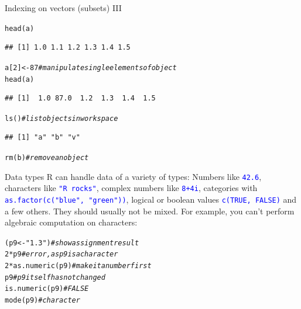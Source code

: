 \documentclass[xcolor=table,           xcolor=dvipsnames]{beamer}\usepackage[]{graphicx}\usepackage[]{color}
\makeatletter
\newcommand{\hlnum}[1]{\textcolor[rgb]{0,0,0}{#1}}
\newcommand{\hlstr}[1]{\textcolor[rgb]{0.545,0.137,0.137}{#1}}
\newcommand{\hlcom}[1]{\textcolor[rgb]{0,0.392,0}{\textit{#1}}}
\newcommand{\hlopt}[1]{\textcolor[rgb]{0,0,0}{#1}}
\newcommand{\hlstd}[1]{\textcolor[rgb]{0,0,0}{#1}}
\newcommand{\hlkwb}[1]{\textcolor[rgb]{0,0,0}{#1}}
\newcommand{\hlkwd}[1]{\textcolor[rgb]{0,0,1}{#1}}
\newenvironment{kframe}{%
 \def\at@end@of@kframe{}%
 \ifinner\ifhmode%
  \def\at@end@of@kframe{\end{minipage}}%
  \begin{minipage}{\columnwidth}%
 \fi\fi%
 \def\FrameCommand##1{\hskip\@totalleftmargin \hskip-\fboxsep
 \colorbox{shadecolor}{##1}\hskip-\fboxsep
     \hskip-\linewidth \hskip-\@totalleftmargin \hskip\columnwidth}%
 \MakeFramed {\advance\hsize-\width
   \@totalleftmargin\z@ \linewidth\hsize
   \@setminipage}}%
 {\par\unskip\endMakeFramed%
 \at@end@of@kframe}
\newenvironment{knitrout}{}{} %
\newcommand{\rcode}[1]{\texttt{\textcolor{Blue}{#1}}} %
\makeatother
\begin{document}
\begin{frame}[fragile]{Indexing on vectors (subsets) III}
\begin{knitrout}
\color{fgcolor}\begin{kframe}
\begin{alltt}
\hlkwd{head}\hlstd{(a)}
\end{alltt}
\begin{verbatim}
## [1] 1.0 1.1 1.2 1.3 1.4 1.5
\end{verbatim}
\begin{alltt}
\hlstd{a[}\hlnum{2}\hlstd{]} \hlkwb{<-} \hlnum{87} \hlcom{# manipulate single elements of object}
\hlkwd{head}\hlstd{(a)}
\end{alltt}
\begin{verbatim}
## [1]  1.0 87.0  1.2  1.3  1.4  1.5
\end{verbatim}
\end{kframe}
\end{knitrout}
\onslide<+->
\begin{knitrout}
\color{fgcolor}\begin{kframe}
\begin{alltt}
\hlkwd{ls}\hlstd{()} \hlcom{# list objects in workspace}
\end{alltt}
\begin{verbatim}
## [1] "a" "b" "v"
\end{verbatim}
\begin{alltt}
\hlkwd{rm}\hlstd{(b)} \hlcom{# remove an object}
\end{alltt}
\end{kframe}
\end{knitrout}
\end{frame}


\begin{frame}[fragile]{Data types}
R can handle data of a variety of types: Numbers like \rcode{42.6}, characters like \rcode{"R rocks"}, complex numbers like \rcode{8+4i}, categories with \rcode{as.factor(c("blue", "green"))}, logical or boolean values \rcode{c(TRUE, FALSE)} and a few others. They should usually not be mixed. For example, you can't perform algebraic computation on characters:
\begin{knitrout}
\color{fgcolor}\begin{kframe}
\begin{alltt}
\hlstd{(p9} \hlkwb{<-} \hlstr{"1.3"}\hlstd{)}    \hlcom{# show assignment result}
\hlnum{2}\hlopt{*}\hlstd{p9}             \hlcom{# error, as p9 is a character}
\hlnum{2}\hlopt{*}\hlkwd{as.numeric}\hlstd{(p9)} \hlcom{# make it a number first}
\hlstd{p9}               \hlcom{# p9 itself has not changed}
\hlkwd{is.numeric}\hlstd{(p9)}   \hlcom{# FALSE}
\hlkwd{mode}\hlstd{(p9)}         \hlcom{# character}
\end{alltt}
\end{kframe}
\end{knitrout}
\end{frame}
\end{document}
